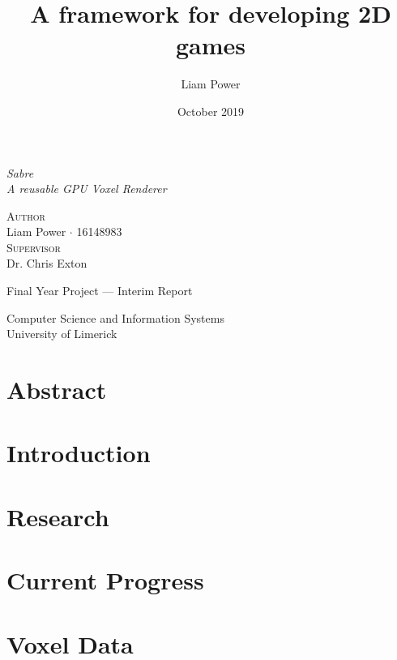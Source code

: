 \documentclass[dvipsnames,12pt,a4paper]{report}
\title{\MakeUppercase A framework for developing 2D games}
\author{Liam Power}
\date{October 2019}
\begin{document}
\begin{titlepage}
   \begin{center}
    \vspace*{0.5cm}
   
    \vspace*{1cm}
    
   \textit{{\Huge Sabre}}\\
   \vspace{0.2cm}
   \textit{{\Large A reusable GPU Voxel Renderer}}\\

   \vspace{2.5cm}

   \textsc{{\Large Author}}\\
   \vspace{0.2cm}
   {\large Liam Power $\cdot$ 16148983} \\
   \vspace{1.5cm}
   \textsc{{\Large Supervisor}}\\
   \vspace{0.2cm}
   {\large Dr. Chris Exton} \\

   \vfill

  Final Year Project --- Interim Report\\
   \vspace{0.8cm}

   Computer Science and Information Systems\\
   University of Limerick\\
 
   \end{center}
   \restoregeometry
\end{titlepage}

\tableofcontents

\chapter*{Abstract}


\chapter{Introduction}


\chapter{Research}


\chapter{Current Progress}


\chapter{Voxel Data}\label{chapter:voxel_data}



\printbibliography[title={References}]
\end{document}
